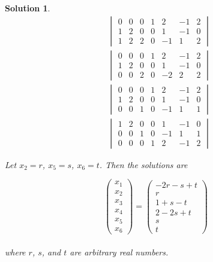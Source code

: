 \documentclass{article}
\newtheorem*{solution}{Solution}
\begin{document}
\begin{solution}

\begin{align*}
&\begin{vmatrix}
0 & 0 & 0 & 1 & 2 & -1 & 2 \\
1 & 2 & 0 & 0 & 1 & -1 & 0 \\
1 & 2 & 2 & 0 & -1 & 1 & 2
\end{vmatrix} \\
&\begin{vmatrix}
0 & 0 & 0 & 1 & 2 & -1 & 2 \\
1 & 2 & 0 & 0 & 1 & -1 & 0 \\
0 & 0 & 2 & 0 & -2 & 2 & 2
\end{vmatrix} \\
&\begin{vmatrix}
0 & 0 & 0 & 1 & 2 & -1 & 2 \\
1 & 2 & 0 & 0 & 1 & -1 & 0 \\
0 & 0 & 1 & 0 & -1 & 1 & 1
\end{vmatrix} \\
&\begin{vmatrix}
1 & 2 & 0 & 0 & 1 & -1 & 0 \\
0 & 0 & 1 & 0 & -1 & 1 & 1 \\
0 & 0 & 0 & 1 & 2 & -1 & 2 
\end{vmatrix}
\end{align*} 

Let $x_{2} = r$, $x_{5} = s$, $x_{6} = t$. Then the solutions are 

\begin{equation*}
\begin{pmatrix}
x_{1} \\ x_{2} \\ x_{3} \\ x_{4} \\ x_{5} \\ x_{6} 
\end{pmatrix}
= 
\begin{pmatrix}
-2r - s + t \\ r \\ 1 + s - t \\ 2 - 2s + t \\ s \\ t
\end{pmatrix}
\end{equation*} \\

where $r$, $s$, and $t$ are arbitrary real numbers.

\end{solution}
\end{document}
